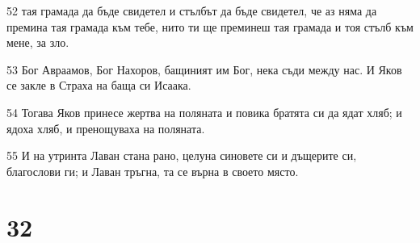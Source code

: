 \par 52 тая грамада да бъде свидетел и стълбът да бъде свидетел, че аз няма да премина тая грамада към тебе, нито ти ще преминеш тая грамада и тоя стълб към мене, за зло.
\par 53 Бог Авраамов, Бог Нахоров, бащиният им Бог, нека съди между нас. И Яков се закле в Страха на баща си Исаака.
\par 54 Тогава Яков принесе жертва на поляната и повика братята си да ядат хляб; и ядоха хляб, и пренощуваха на поляната.
\par 55 И на утринта Лаван стана рано, целуна синовете си и дъщерите си, благослови ги; и Лаван тръгна, та се върна в своето място.

\chapter{32}

